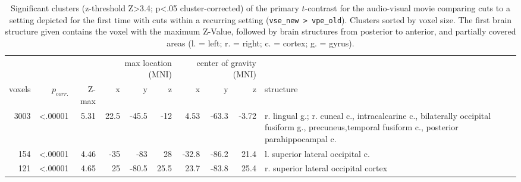\documentclass[english]{article}
\begin{document}
\begin{table}[h!]
\caption{Significant clusters (z-threshold Z>3.4; p<.05 cluster-corrected)
    of the primary $t$-contrast for the audio-visual movie comparing cuts to a
    setting depicted for the first time with cuts within a recurring setting
    (\texttt{vse\_new > vpe\_old}).
    Clusters sorted by voxel size.
    The first brain structure given contains the voxel with the maximum Z-Value,
    followed by brain structures from posterior to anterior, and partially
    covered areas (l. = left; r. = right; c. = cortex; g. = gyrus).}
\label{tab:res-av-group1}
\begin{tabular}{rrrrrrrrrp{3cm}}
\toprule
& & & \multicolumn{3}{r}{max location (MNI)} & \multicolumn{3}{r}{center of gravity (MNI)} &
\\ \cmidrule{4-6} \cmidrule{7-9}
voxels & $p_{corr.}$ & Z-max & x & y & z  & x & y & z & structure \\
\midrule
3003 & <.00001 & 5.31 & 22.5 & -45.5 & -12 & 4.53 & -63.3 & -3.72 & r. lingual g.; r.
cuneal c., intracalcarine c., bilaterally occipital fusiform g., precuneus,temporal fusiform c., posterior parahippocampal c.  \\
154 & <.00001 & 4.46 & -35 & -83 & 28 & -32.8 & -86.2 & 21.4 & l. superior
lateral occipital c. \\ %
121 & <.00001 & 4.65 & 25 & -80.5 & 25.5 & 23.7 & -83.8 & 25.4 & r. superior
lateral occipital cortex \\ %
\bottomrule
\end{tabular}
\end{table}
\end{document}
